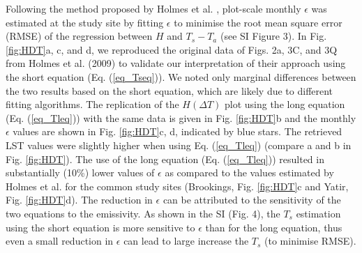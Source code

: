 \documentclass[fleqn,10pt]{wlscirep}
\begin{document}
Following the method proposed by Holmes et al. \cite{holmes2009land, holmes2016cloud}, plot-scale monthly $\epsilon$ was estimated at the study site by fitting $\epsilon$ to minimise the root mean square error (RMSE) of the regression between $H$ and $T_s - T_a$ (see SI Figure 3). In Fig. \ref{fig:HDT}a, c, and d, we reproduced the original data of Figs. 2a, 3C, and 3Q from Holmes et al. (2009) \cite{holmes2009land} to validate our interpretation of their approach using the short equation (Eq. (\ref{eq_Tseq})). We noted only marginal differences between the two results based on the short equation, which are likely due to different fitting algorithms. The replication of the $H (\Delta T)$ plot using the long equation (Eq. (\ref{eq_Tleq})) with the same data is given in Fig. \ref{fig:HDT}b and the monthly $\epsilon$ values are shown in Fig. \ref{fig:HDT}c, d, indicated by blue stars. The retrieved LST values were slightly higher when using Eq. (\ref{eq_Tleq}) (compare a and b in Fig. \ref{fig:HDT}). The use of the long equation (Eq. (\ref{eq_Tleq})) resulted in substantially (10\%) lower values of $\epsilon$ as compared to the values estimated by Holmes et al.\cite{holmes2009land} for the common study sites (Brookings, Fig. \ref{fig:HDT}c and Yatir, Fig. \ref{fig:HDT}d). The reduction in $\epsilon$ can be attributed to the sensitivity of the two equations to the emissivity. As  shown in the SI (Fig. 4), the $T_{s}$ estimation using the short equation is more sensitive to $\epsilon$ than for the long equation, thus even a small reduction in $\epsilon$ can lead to large increase the $T_{s}$ (to minimise RMSE). 
\end{document}
